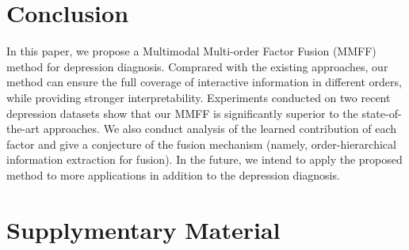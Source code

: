 \documentclass{article}
\begin{document}


\section{Conclusion}
In this paper, we propose a Multimodal Multi-order Factor Fusion (MMFF) method for depression diagnosis. Comprared with the existing approaches, our method can ensure the full coverage of interactive information in different orders, while providing stronger interpretability.
Experiments conducted on two recent depression datasets show that our MMFF is significantly superior to the state-of-the-art approaches. We also conduct analysis of the learned contribution of each factor and give a conjecture of the fusion mechanism (namely, order-hierarchical information extraction for fusion).
In the future, we intend to apply the proposed method to more applications in addition to the depression diagnosis.




\newpage

\section{Supplymentary Material}
\end{document}

